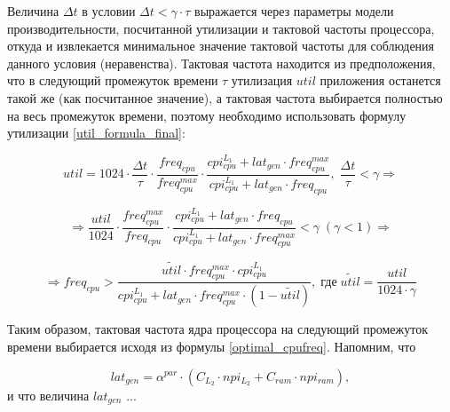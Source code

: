     Величина $\Delta t$ в условии $\Delta t < \gamma \cdot \tau$ выражается через параметры модели
    производительности, посчитанной утилизации и тактовой частоты процессора, откуда и извлекается минимальное
    значение тактовой частоты для соблюдения данного условия (неравенства). Тактовая частота находится из
    предположения, что в следующий промежуток времени $\tau$ утилизация $util$ приложения останется
    такой же (как посчитанное значение), а тактовая частота выбирается полностью на весь промежуток времени,
    поэтому необходимо использовать формулу утилизации \eqref{util_formula_final}:

    \begin{equation}
        util = 1024 \cdot \frac{\Delta t}{\tau} \cdot \frac{freq_{cpu}}{freq_{cpu}^{max}} \cdot
            \frac{cpi_{cpu}^{L_1} + lat_{gen} \cdot freq_{cpu}^{max}}
                 {cpi_{cpu}^{L_1} + lat_{gen} \cdot freq_{cpu}}, \; \frac{\Delta t}{\tau} < \gamma \Rightarrow
    \end{equation}

    \begin{equation}
        \Rightarrow \frac{util}{1024} \cdot \frac{freq_{cpu}^{max}}{freq_{cpu}} \cdot
        \frac{cpi_{cpu}^{L_1} + lat_{gen} \cdot freq_{cpu}}
             {cpi_{cpu}^{L_1} + lat_{gen} \cdot freq_{cpu}^{max}} < \gamma \; (\gamma < 1) \Rightarrow
    \end{equation}

    \begin{equation} \label{optimal_cpufreq}
        \Rightarrow freq_{cpu} > \frac{\tilde{util} \cdot freq_{cpu}^{max} \cdot cpi_{cpu}^{L_1}}
        {cpi_{cpu}^{L_1} + lat_{gen} \cdot freq_{cpu}^{max} \cdot (1 - \tilde{util})}, \;
        \text{где} \; \tilde{util} = \frac{util}{1024 \cdot \gamma}
    \end{equation}


    Таким образом, тактовая частота ядра процессора на следующий промежуток времени выбирается исходя
    из формулы \eqref{optimal_cpufreq}. Напомним, что

    \begin{equation*}
        lat_{gen} = \alpha^{par} \cdot \left( C_{L_2} \cdot npi_{L_2} + C_{ram} \cdot npi_{ram} \right),
    \end{equation*}
    и что величина $lat_{gen}$ ...






\newpage
